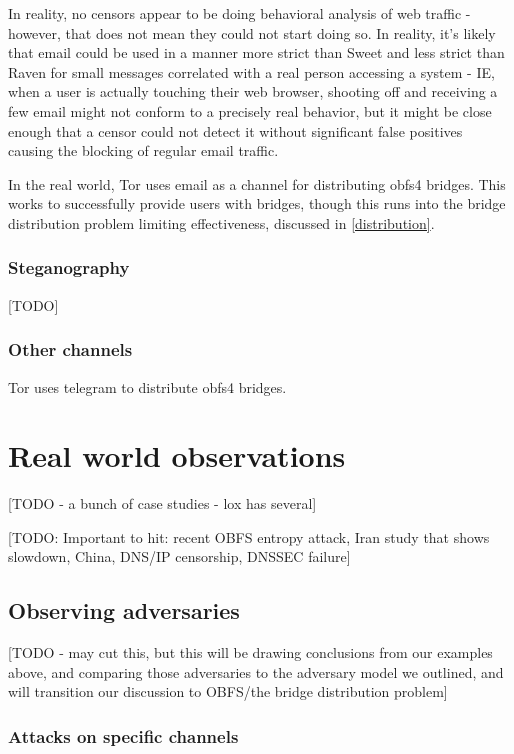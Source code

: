 \documentclass[12pt]{report}
\begin{document}
In reality, no censors appear to be doing behavioral analysis of web traffic - however, that does not mean they could not start doing so. In reality, it's likely that email could be used in a manner more strict than Sweet and less strict than Raven for small messages correlated with a real person accessing a system - IE, when a user is actually touching their web browser, shooting off and receiving a few email might not conform to a precisely real behavior, but it might be close enough that a censor could not detect it without significant false positives causing the blocking of regular email traffic.

In the real world, Tor uses email as a channel for distributing obfs4 bridges. This works to successfully provide users with bridges, though this runs into the bridge distribution problem limiting effectiveness, discussed in \ref{distribution}.

\subsubsection{Steganography}

[TODO]

\subsubsection{Other channels}

Tor uses telegram to distribute obfs4 bridges.\cite{telegram}

\section{Real world observations}
\label{real}

[TODO - a bunch of case studies - lox has several]

[TODO: Important to hit: recent OBFS entropy attack, Iran study that shows slowdown, China, DNS/IP censorship, DNSSEC failure]

\subsection{Observing adversaries}

[TODO - may cut this, but this will be drawing conclusions from our examples above, and comparing those adversaries to the adversary model we outlined, and will transition our discussion to OBFS/the bridge distribution problem]

\subsubsection{Attacks on specific channels}
\end{document}
